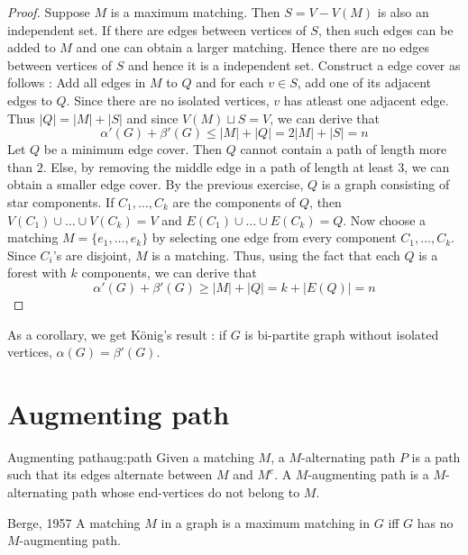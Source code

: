 \documentclass[../basic_graph_theory.tex]{subfiles}
\begin{document}
\begin{proof}
    Suppose $M$ is a maximum matching. Then $S = V - V(M)$ is also an independent set. If there are edges between vertices of $S$, then such edges can be added to $M$ and one can obtain a larger matching. Hence there are no edges between vertices of $S$ and hence it is a independent set. Construct a edge cover as follows : Add all edges in $M$ to $Q$ and for each $v \in S$, add one of its adjacent edges to $Q$.  Since there are no isolated vertices,  $v$ has atleast one adjacent edge.  Thus $|Q| = |M| + |S|$ and since $V(M) \sqcup S = V$, we can derive that
    \[
        \alpha'(G) + \beta'(G) \leq |M| + |Q| = 2|M| + |S| = n
    \]
    Let $Q$ be a minimum edge cover. Then $Q$ cannot contain a path of length more than $2$. Else, by removing the middle edge in a path of length at least 3, we can obtain a smaller edge cover. By the previous exercise, $Q$ is a graph consisting of star components. If $C_1,\ldots,C_k$ are the components of $Q$, then $V(C_1) \cup \ldots \cup V(C_k) = V$ and $E(C_1) \cup \ldots \cup E(C_k) = Q$. Now choose a matching $M = \{e_1,\ldots,e_k\}$ by selecting one edge from every component $C_1,\ldots,C_k$.  Since $C_i$'s are disjoint, $M$ is a matching. Thus, using the fact that each $Q$ is a forest with $k$ components, we can derive that
    \[
        \alpha'(G) + \beta'(G)  \geq |M| + |Q| = k + |E(Q)| = n
    \]
\end{proof}

As a corollary, we get K\"{o}nig's result : if $G$ is bi-partite graph without isolated vertices, $\alpha(G) = \beta'(G)$.

\section{Augmenting path}

\begin{Def}{Augmenting path}{aug:path}
    Given a matching $M$, a $M$-alternating path $P$ is a path such that its edges alternate between $M$ and $M^c$.  A $M$-augmenting path is a $M$-alternating path whose end-vertices do not belong to $M$.
\end{Def}

\begin{Thm}{Berge, 1957}{}
    A matching $M$ in a graph is a maximum matching in $G$ iff $G$ has no $M$-augmenting path.
\end{Thm}
\end{document}
